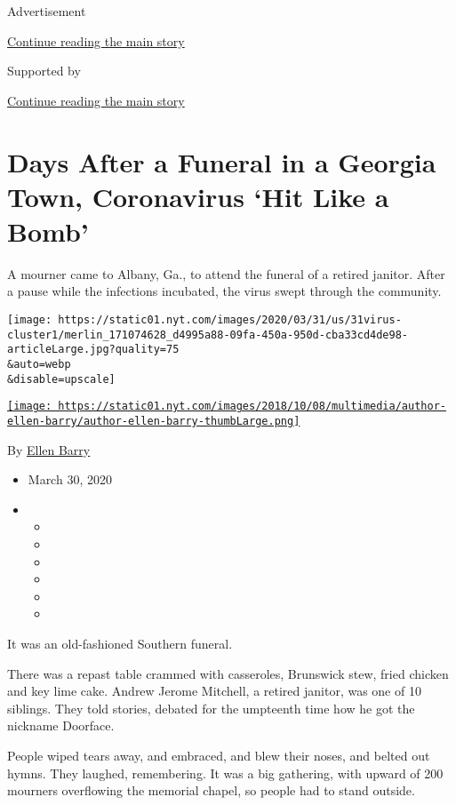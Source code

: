 Advertisement

\protect\hyperlink{after-top}{Continue reading the main story}

Supported by

\protect\hyperlink{after-sponsor}{Continue reading the main story}

\hypertarget{days-after-a-funeral-in-a-georgia-town-coronavirus-hit-like-a-bomb}{%
\section{Days After a Funeral in a Georgia Town, Coronavirus `Hit Like a
Bomb'}\label{days-after-a-funeral-in-a-georgia-town-coronavirus-hit-like-a-bomb}}

A mourner came to Albany, Ga., to attend the funeral of a retired
janitor. After a pause while the infections incubated, the virus swept
through the community.

\texttt{[image: https://static01.nyt.com/images/2020/03/31/us/31virus-cluster1/merlin\_171074628\_d4995a88-09fa-450a-950d-cba33cd4de98-articleLarge.jpg?quality=75\\\&auto=webp\\\&disable=upscale]}

\href{https://www.nytimes.com/by/ellen-barry}{\texttt{[image: https://static01.nyt.com/images/2018/10/08/multimedia/author-ellen-barry/author-ellen-barry-thumbLarge.png]}}

By \href{https://www.nytimes.com/by/ellen-barry}{Ellen Barry}

\begin{itemize}
\item
  March 30, 2020
\item
  \begin{itemize}
  \item
  \item
  \item
  \item
  \item
  \item
  \end{itemize}
\end{itemize}

It was an old-fashioned Southern funeral.

There was a repast table crammed with casseroles, Brunswick stew, fried
chicken and key lime cake. Andrew Jerome Mitchell, a retired janitor,
was one of 10 siblings. They told stories, debated for the umpteenth
time how he got the nickname Doorface.

People wiped tears away, and embraced, and blew their noses, and belted
out hymns. They laughed, remembering. It was a big gathering, with
upward of 200 mourners overflowing the memorial chapel, so people had to
stand outside.

